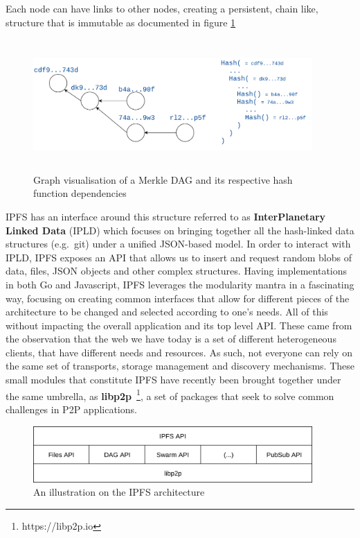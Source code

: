 Each node can have links to
other nodes, creating a persistent, chain like, structure that is
immutable as documented in figure \ref{fig:merkle-dag}

\begin{figure}[hb!]
  \centering
  \includegraphics[max height=5cm,max width=0.95\textwidth]{img/merkle-dag.png}
  \caption{Graph visualisation of a Merkle DAG and its respective hash function dependencies}
  \label{fig:merkle-dag}
\end{figure}

IPFS has an interface around this structure referred to as
\textbf{InterPlanetary Linked Data} (IPLD)
which focuses on bringing together all the hash-linked data structures
(e.g.~git) under a unified JSON-based model. In order
to interact with IPLD, IPFS exposes an API that allows us to insert and
request random blobs of data, files, JSON objects and other complex
structures. Having implementations in both Go and
Javascript, IPFS leverages the modularity mantra in a fascinating way,
focusing on creating common interfaces that allow for different pieces
of the architecture to be changed and selected according to one's needs.
All of this without impacting the overall application and its top level API.
These came from the observation that the web we have today is a set of
different heterogeneous clients, that have different needs and resources. As
such, not everyone can rely on the same set of transports, storage management
and discovery mechanisms. These small modules that constitute IPFS have
recently been brought together under the same umbrella, as
\textbf{libp2p}~\footnote{https://libp2p.io}, a set of packages that seek to
solve common challenges in P2P applications. 

\begin{figure}[hb!]
  \centering
  \includegraphics[width=0.95\textwidth]{img/ipfs-stack.png}
  \caption{An illustration on the IPFS architecture}
  \label{fig:ipfs-stack}
\end{figure}

